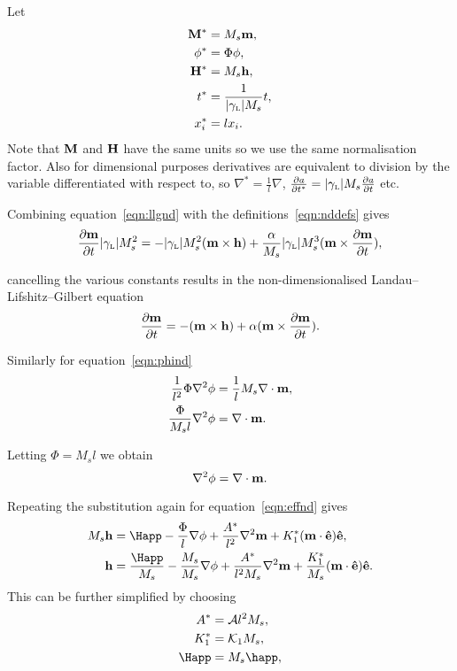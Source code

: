 Let
\begin{align}
  \mathbf{M}^* &= M_s \mathbf{m}, \notag \\
  \phi^* &= \Phi \phi, \notag \\
  \mathbf{H}^* &= M_s \mathbf{h}, \label{eqn:nddefs} \\
  t^* &= \frac{1}{{|\gamma_{\text{\tiny{L}}}|} M_s} t, \notag \\
  x_i^* &= l x_i. \notag
\end{align}
Note that $\mathbf{M}$ and $\mathbf{H}$ have the same units so we use the same normalisation factor. Also for dimensional purposes derivatives are equivalent to division by the variable differentiated with respect to, so $\nabla^* = \frac{1}{l} \nabla$, $\frac{\partial a}{\partial t^*} = {|\gamma_{\text{\tiny{L}}}|} M_s \frac{\partial a}{\partial t}$ etc.

Combining equation~\eqref{eqn:llgnd} with the definitions~\eqref{eqn:nddefs} gives
\begin{equation}
  \notag
  \frac{\partial \mathbf{m}}{\partial t} {|\gamma_{\text{\tiny{L}}}|} M_s^2 =
  - {|\gamma_{\text{\tiny{L}}}|} M_s^2 (\mathbf{m} \times \mathbf{h}) + \frac{\alpha}{M_s} {|\gamma_{\text{\tiny{L}}}|} M_s^3 (\mathbf{m} \times \frac{\partial \mathbf{m}}{\partial t}),
\end{equation}

cancelling the various constants results in the non-dimensionalised Landau--Lifshitz--Gilbert equation
\begin{equation}
  \label{eq:53}
  \frac{\partial \mathbf{m}}{\partial t} = - (\mathbf{m} \times \mathbf{h}) + \alpha (\mathbf{m} \times \frac{\partial \mathbf{m}}{\partial t}).
\end{equation}

Similarly for equation~\eqref{eqn:phind}
\begin{align*}
  \frac{1}{l^2} \Phi \nabla^{2} \phi &= \frac{1}{l} M_s \nabla \cdot \mathbf{m}, \\
  \frac{\Phi}{M_s l} \nabla^{2} \phi &= \nabla \cdot \mathbf{m}. 
\end{align*}

Letting $\Phi = M_s l$ we obtain
\begin{equation}
  \label{eq:57}
  \nabla^2 \phi = \nabla \cdot \mathbf{m}.
\end{equation}

Repeating the substitution again for equation~\eqref{eqn:effnd} gives
\begin{align*}
  M_s \hv &= \Happ - \frac{\Phi}{l} \nabla \phi + \frac{\Exchc^*}{l^2} \nabla^2 \mv + \Kone^* (\mv \cdot \ev) \ev, \\
  \hv &= \frac{\Happ}{M_s} - \frac{M_s}{M_s} \nabla \phi + \frac{\Exchc^*}{l^2 M_s} \nabla^2 \mv + \frac{\Kone^*}{M_s} (\mv \cdot \ev) \ev.
\end{align*}
This can be further simplified by choosing
\begin{align}
  \Exchc^* &= \exchc l^2 M_s, \notag \\
  \Kone^* &= \kone M_s, \notag \\
  \Happ &= M_s \happ,
  \label{eqn:ndfields}
\end{align}

